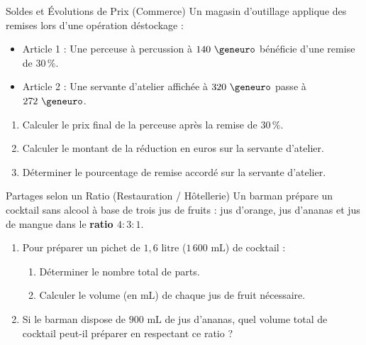 \begin{exercice}[3 pts]{\capAnalyser}{Soldes et Évolutions de Prix (Commerce)}
Un magasin d'outillage applique des remises lors d'une opération déstockage :
\begin{itemize}
    \item Article 1 : Une perceuse à percussion à $140\text{ \euro{}}$ bénéficie d'une remise de $30\,\%$.
    \item Article 2 : Une servante d'atelier affichée à $320\text{ \euro{}}$ passe à $272\text{ \euro{}}$.
\end{itemize}

\begin{enumerate}
    \item Calculer le prix final de la perceuse après la remise de $30\,\%$.
    \item Calculer le montant de la réduction en euros sur la servante d'atelier.
    \item Déterminer le pourcentage de remise accordé sur la servante d'atelier.
\end{enumerate}
\lignesreponse[5]
\end{exercice}

\begin{exercice}[4 pts]{\capRealiser}{Partages selon un Ratio (Restauration / Hôtellerie)}
Un barman prépare un cocktail sans alcool à base de trois jus de fruits : jus d'orange, jus d'ananas et jus de mangue dans le \textbf{ratio $4 : 3 : 1$}.

\begin{enumerate}
    \item Pour préparer un pichet de $1{,}6\text{ litre}$ ($1\,600\text{ mL}$) de cocktail :
    \begin{enumerate}
        \item Déterminer le nombre total de parts.
        \item Calculer le volume (en mL) de chaque jus de fruit nécessaire.
    \end{enumerate}
    \item Si le barman dispose de $900\text{ mL}$ de jus d'ananas, quel volume total de cocktail peut-il préparer en respectant ce ratio ?
\end{enumerate}
\lignesreponse[5]
\end{exercice}

